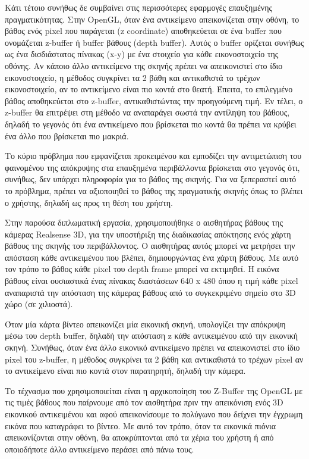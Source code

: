 Κάτι τέτοιο συνήθως δε συμβαίνει στις περισσότερες εφαρμογές επαυξημένης πραγματικότητας. Στην OpenGL, όταν ένα αντικείμενο απεικονίζεται στην οθόνη, το βάθος ενός pixel που παράγεται (z coordinate) αποθηκεύεται σε ένα buffer που ονομάζεται z-buffer ή buffer βάθους (depth buffer). Αυτός ο buffer ορίζεται συνήθως ως ένα δισδιάστατος πίνακας (x-y) με ένα στοιχείο για κάθε εικονοστοιχείο της οθόνης. Αν κάποιο άλλο αντικείμενο της σκηνής πρέπει να απεικονιστεί στο ίδιο εικονοστοιχείο, η μέθοδος συγκρίνει τα 2 βάθη και αντικαθιστά το τρέχων εικονοστοιχείο, αν το αντικείμενο είναι πιο κοντά στο θεατή. Έπειτα, το επιλεγμένο βάθος αποθηκεύεται στο z-buffer, αντικαθιστώντας την προηγούμενη τιμή. Εν τέλει, ο z-buffer θα επιτρέψει στη μέθοδο να αναπαράγει σωστά την αντίληψη του βάθους, δηλαδή το γεγονός ότι ένα αντικείμενο που βρίσκεται πιο κοντά θα πρέπει να κρύβει ένα άλλο που βρίσκεται πιο μακριά.


Το κύριο πρόβλημα που εμφανίζεται προκειμένου και εμποδίζει την αντιμετώπιση του φαινομένου της απόκρυψης στα επαυξημένα περιβάλλοντα βρίσκεται στο γεγονός ότι, συνήθως, δεν υπάρχει πληροφορία για το βάθος της σκηνής. Για να ξεπεραστεί αυτό το πρόβλημα, πρέπει να αξιοποιηθεί το βάθος της πραγματικής σκηνής όπως το βλέπει ο χρήστης, δηλαδή ως προς τη θέση του χρήστη. 

Στην παρούσα διπλωματική εργασία, χρησιμοποιήθηκε ο αισθητήρας βάθους της κάμερας Realsense 3D, για την υποστήριξη της διαδικασίας απόκτησης ενός χάρτη βάθους της σκηνής του περιβάλλοντος. O αισθητήρας αυτός μπορεί να μετρήσει την απόσταση κάθε αντικειμένου που βλέπει, δημιουργώντας ένα χάρτη βάθους. Με αυτό τον τρόπο το βάθος κάθε pixel του depth frame μπορεί να εκτιμηθεί. Η εικόνα βάθους είναι ουσιαστικά ένας πίνακας διαστάσεων 640 x 480  όπου η τιμή κάθε pixel αναπαριστά την απόσταση της κάμερας βάθους από το συγκεκριμένο σημείο στο 3D χώρο (σε χιλιοστά). 


Όταν μία κάρτα βίντεο απεικονίζει μία εικονική σκηνή, υπολογίζει την απόκρυψη μέσω του depth buffer, δηλαδή την απόσταση z κάθε αντικειμένου από την εικονική σκηνή. Συνήθως, όταν ένα άλλο εικονικό αντικείμενο πρέπει να απεικονιστεί στο ίδιο pixel του z-buffer, η μέθοδος συγκρίνει τα 2 βάθη και αντικαθιστά το τρέχων pixel αν το αντικείμενο είναι πιο κοντά στον παρατηρητή, δηλαδή την κάμερα.

Το τέχνασμα που χρησιμοποιείται είναι η αρχικοποίηση του Z-Buffer της OpenGL με τις τιμές βάθους που παίρνουμε από τον αισθητήρα πριν την απεικόνιση ενός 3D εικονικού αντικειμένου και αφού απεικονίσουμε το πολύγωνο που δείχνει την έγχρωμη εικόνα που καταγράφει το βίντεο. Με αυτό τον τρόπο, όταν τα εικονικά πιόνια απεικονίζονται στην οθόνη, θα αποκρύπτονται από τα χέρια του χρήστη ή από οποιοδήποτε άλλο αντικείμενο περάσει από πάνω τους. 

